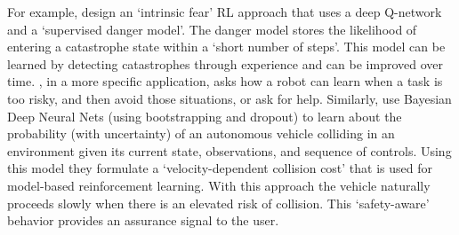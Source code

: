 For example, \citet{Lipton2016-dq} design an `intrinsic fear' RL approach that uses a deep Q-network and a `supervised danger model'. The danger model stores the likelihood of entering a catastrophe state within a `short number of steps'. This model can be learned by detecting catastrophes through experience and can be improved over time. \citet{Curran2016-ij}, in a more specific application, asks how a robot can learn when a task is too risky, and then avoid those situations, or ask for help. 
Similarly, \citet{Kahn2017-vy} use Bayesian Deep Neural Nets (using bootstrapping and dropout) to learn about the probability (with uncertainty) of an autonomous vehicle colliding in an environment given its current state, observations, and sequence of controls. Using this model they formulate a `velocity-dependent collision cost' that is used for model-based reinforcement learning. With this approach the vehicle naturally proceeds slowly when there is an elevated risk of collision. This `safety-aware' behavior provides an assurance signal to the user. 

